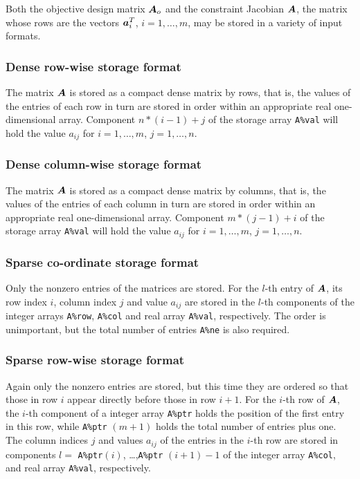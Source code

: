 \documentclass{galahad}
\begin{document}

\galmatrix
Both the objective design matrix ${\bm{A}}_o$ and
the constraint Jacobian ${\bm{A}}$, the matrix
whose rows are the vectors ${\bm{a}}_{i}^{T}$, $i = 1, \ldots , m$,
may be stored in a variety of input formats.

\subsubsection{Dense row-wise storage format}\label{dense}
The matrix ${\bm{A}}$ is stored as a compact
dense matrix by rows, that is, the values of the entries of each row in turn are
stored in order within an appropriate real one-dimensional array.
Component $n \ast (i-1) + j$ of the storage array {\tt A\%val} will hold the
value $a_{ij}$ for $i = 1, \ldots , m$, $j = 1, \ldots , n$.

\subsubsection{Dense column-wise storage format}\label{densecolumnwise}
The matrix ${\bm{A}}$ is stored as a compact
dense matrix by columns, that is, the values of the entries of each column
in turn are stored in order within an appropriate real one-dimensional array.
Component $m \ast (j-1) + i$ of the storage array {\tt A\%val} will hold the
value $a_{ij}$ for $i = 1, \ldots , m$, $j = 1, \ldots , n$.

\subsubsection{Sparse co-ordinate storage format}\label{coordinate}
Only the nonzero entries of the matrices are stored. For the
$l$-th entry of ${\bm{A}}$, its row index $i$, column index $j$
and value $a_{ij}$
are stored in the $l$-th components of the integer arrays {\tt A\%row},
{\tt A\%col} and real array {\tt A\%val}, respectively.
The order is unimportant, but the total
number of entries {\tt A\%ne} is also required.

\subsubsection{Sparse row-wise storage format}\label{rowwise}
Again only the nonzero entries are stored, but this time
they are ordered so that those in row $i$ appear directly before those
in row $i+1$. For the $i$-th row of ${\bm{A}}$, the $i$-th component of a
integer array {\tt A\%ptr} holds the position of the first entry in this row,
while {\tt A\%ptr} $(m+1)$ holds the total number of entries plus one.
The column indices $j$ and values $a_{ij}$ of the entries in the $i$-th row
are stored in components
$l =$ {\tt A\%ptr}$(i)$, \ldots ,{\tt A\%ptr} $(i+1)-1$ of the
integer array {\tt A\%col}, and real array {\tt A\%val}, respectively.
\end{document}
